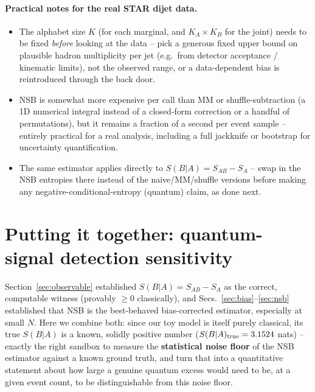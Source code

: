 \documentclass[11pt]{article}
\newcommand{\SBA}{S(B|A)}
\begin{document}
\paragraph{Practical notes for the real STAR dijet data.}
\begin{itemize}
\item The alphabet size $K$ (for each marginal, and $K_A\times K_B$ for
the joint) needs to be fixed \emph{before} looking at the data -- pick a
generous fixed upper bound on plausible hadron multiplicity per jet
(e.g.\ from detector acceptance / kinematic limits), not the observed
range, or a data-dependent bias is reintroduced through the back door.
\item NSB is somewhat more expensive per call than MM or
shuffle-subtraction (a 1D numerical integral instead of a closed-form
correction or a handful of permutations), but it remains a fraction of a
second per event sample -- entirely practical for a real analysis,
including a full jackknife or bootstrap for uncertainty quantification.
\item The same estimator applies directly to $\SBA=S_{AB}-S_A$ -- swap in
the NSB entropies there instead of the naive/MM/shuffle versions before
making any negative-conditional-entropy (quantum) claim, as done next.
\end{itemize}

\section{Putting it together: quantum-signal detection sensitivity}
\label{sec:sensitivity}

Section~\ref{sec:observable} established $\SBA=S_{AB}-S_A$ as the correct,
computable witness (provably $\geq0$ classically), and
Secs.~\ref{sec:bias}--\ref{sec:nsb} established that NSB is the
best-behaved bias-corrected estimator, especially at small $N$. Here we
combine both: since our toy model is itself purely classical, its true
$\SBA$ is a known, solidly positive number ($\SBA_{\rm true}=3.1524$
nats) -- exactly the right sandbox to measure the \textbf{statistical
noise floor} of the NSB estimator against a known ground truth, and turn
that into a quantitative statement about how large a genuine quantum
excess would need to be, at a given event count, to be distinguishable
from this noise floor.
\end{document}
